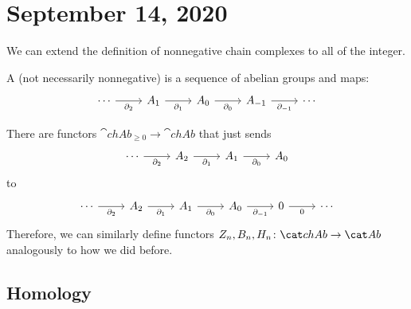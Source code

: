 \documentclass{standalone}
\begin{document}
\chapter{September 14, 2020}

We can extend the definition of nonnegative chain complexes to
all of the integer.
\begin{definition}
  A (not necessarily nonnegative)  is a sequence of
  abelian groups and maps:
  \[
    \begin{tikzcd}
      \cdots \ar[r, "\partial_2"   , swap] &
      A_1    \ar[r, "\partial_1"   , swap] &
      A_0    \ar[r, "\partial_0"   , swap] &
      A_{-1} \ar[r, "\partial_{-1}", swap] &
      \cdots
    \end{tikzcd}
  \]
\end{definition}

There are functors \(\cat{chAb}_{\geq 0} \to \cat{chAb}\) that just sends
\[
  \begin{tikzcd}
    \cdots \ar[r, "\partial_2", swap] &
    A_2    \ar[r, "\partial_1", swap] &
    A_1    \ar[r, "\partial_0", swap] &
    A_0
  \end{tikzcd}
\]
to
\[
  \begin{tikzcd}
    \cdots \ar[r, "\partial_2", swap] &
    A_2    \ar[r, "\partial_1", swap] &
    A_1    \ar[r, "\partial_0", swap] &
    A_0    \ar[r, "\partial_{-1}", swap] &
    0 \ar[r, "0", swap] &
    \cdots
  \end{tikzcd}
\]
Therefore, we can similarly define functors
\(Z_n, B_n, H_n \colon \cchAb \to \cAb\)
analogously to how we did before.


\section{Homology}
\end{document}
